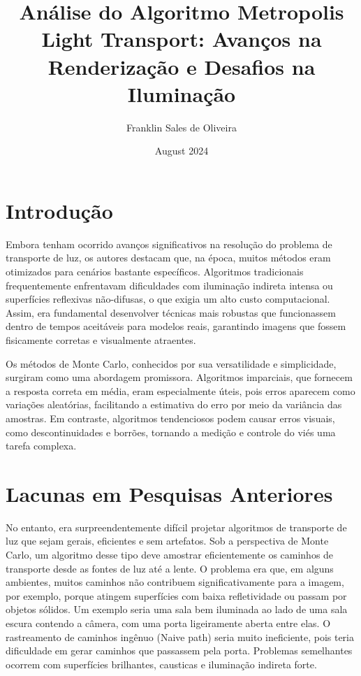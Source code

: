 \documentclass{article}
\title{Análise do Algoritmo Metropolis Light Transport: Avanços na Renderização e Desafios na Iluminação}
\author{Franklin Sales de Oliveira}
\date{August 2024}
\begin{document}
\maketitle

\section{Introdução}
Embora tenham ocorrido avanços significativos na resolução do problema de transporte de luz, os autores destacam que, na época, muitos métodos eram otimizados para cenários bastante específicos. Algoritmos tradicionais frequentemente enfrentavam dificuldades com iluminação indireta intensa ou superfícies reflexivas não-difusas, o que exigia um alto custo computacional. Assim, era fundamental desenvolver técnicas mais robustas que funcionassem dentro de tempos aceitáveis para modelos reais, garantindo imagens que fossem fisicamente corretas e visualmente atraentes.

Os métodos de Monte Carlo, conhecidos por sua versatilidade e simplicidade, surgiram como uma abordagem promissora. Algoritmos imparciais, que fornecem a resposta correta em média, eram especialmente úteis, pois erros aparecem como variações aleatórias, facilitando a estimativa do erro por meio da variância das amostras. Em contraste, algoritmos tendenciosos podem causar erros visuais, como descontinuidades e borrões, tornando a medição e controle do viés uma tarefa complexa.

\section{Lacunas em Pesquisas Anteriores}
No entanto, era surpreendentemente difícil projetar algoritmos de transporte de luz que sejam gerais, eficientes e sem artefatos. Sob a perspectiva de Monte Carlo, um algoritmo desse tipo deve amostrar eficientemente os caminhos de transporte desde as fontes de luz até a lente. O problema era que, em alguns ambientes, muitos caminhos não contribuem significativamente para a imagem, por exemplo, porque atingem superfícies com baixa refletividade ou passam por objetos sólidos. Um exemplo seria uma sala bem iluminada ao lado de uma sala escura contendo a câmera, com uma porta ligeiramente aberta entre elas. O rastreamento de caminhos ingênuo (Naive path) seria muito ineficiente, pois teria dificuldade em gerar caminhos que passassem pela porta. Problemas semelhantes ocorrem com superfícies brilhantes, causticas e iluminação indireta forte.
\end{document}
